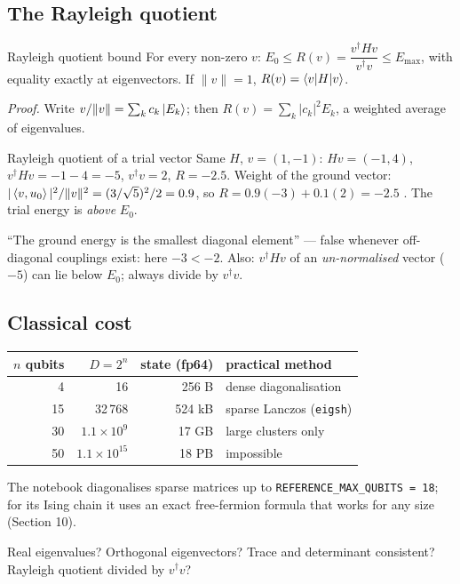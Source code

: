 \documentclass[11pt,a4paper,openany]{book}
\newcounter{wex}[chapter]
\begin{document}
\subsection{The Rayleigh quotient}
\begin{keyres}{Rayleigh quotient bound}
For every non-zero $v$: $E_0 \le R(v) = \dfrac{v^\dagger Hv}{v^\dagger v} \le E_{\max}$, with equality exactly at eigenvectors. If $\|v\| = 1$, $R(v) = \braket{v|H|v}$.
\end{keyres}
\emph{Proof.} Write $v/\|v\| = \sum_kc_k\ket{E_k}$; then $R(v) = \sum_k|c_k|^2E_k$, a weighted average of eigenvalues.
\begin{wexample}{Rayleigh quotient of a trial vector}
Same $H$, $v = (1, -1)$: $Hv = (-1, 4)$, $v^\dagger Hv = -1 - 4 = -5$, $v^\dagger v = 2$, $R = -2.5$. Weight of the ground vector:
$|\braket{v, u_0}|^2/\|v\|^2 = (3/\sqrt5)^2/2 = 0.9$, so $R = 0.9(-3) + 0.1(2) = -2.5$ \checkmark. The trial energy is \emph{above} $E_0$.
\end{wexample}
\begin{trap}
``The ground energy is the smallest diagonal element'' --- false whenever off-diagonal couplings exist: here $-3 < -2$. Also: $v^\dagger Hv$ of an
\emph{un-normalised} vector ($-5$) can lie below $E_0$; always divide by $v^\dagger v$.
\end{trap}

\subsection{Classical cost}
\begin{center}\small
\begin{tabular}{rrrl}
\toprule $n$ qubits & $D = 2^n$ & state (fp64) & practical method\\ \midrule
4 & 16 & 256 B & dense diagonalisation\\
15 & 32\,768 & 524 kB & sparse Lanczos (\texttt{eigsh})\\
30 & $1.1\times10^9$ & 17 GB & large clusters only\\
50 & $1.1\times10^{15}$ & 18 PB & impossible\\ \bottomrule
\end{tabular}
\end{center}
The notebook diagonalises sparse matrices up to \texttt{REFERENCE\_MAX\_QUBITS = 18}; for its Ising chain it uses an exact free-fermion formula
that works for any size (Section 10).
\begin{checklist}
Real eigenvalues? Orthogonal eigenvectors? Trace and determinant consistent? Rayleigh quotient divided by $v^\dagger v$?
\end{checklist}
\end{document}
